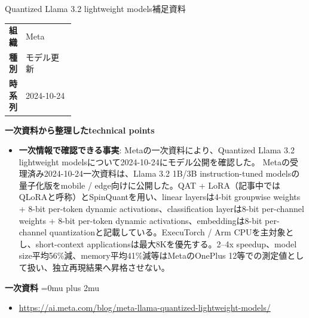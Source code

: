 \begin{technicalnote}{Quantized Llama 3.2 lightweight models}{補足資料}
\begingroup
\begin{tabularx}{\linewidth}{@{}>{\bfseries}p{0.22\linewidth}X@{}}
組織 & Meta \\
種別 & モデル更新 \\
時系列 & 2024-10-24 \\
\end{tabularx}
\smallskip
{\bfseries 一次資料から整理したtechnical points}
\begin{itemize}[leftmargin=1.5em,itemsep=0.35em]
\item \textbf{一次情報で確認できる事実}: Metaの一次資料により、Quantized Llama 3.2 lightweight modelsについて2024-10-24にモデル公開を確認した。 Metaの受理済み2024-10-24一次資料は、Llama 3.2 1B/3B instruction-tuned modelsの量子化版をmobile / edge向けに公開した。QAT + LoRA（記事中ではQLoRAと呼称）とSpinQuantを用い、linear layersは4-bit groupwise weights + 8-bit per-token dynamic activations、classification layerは8-bit per-channel weights + 8-bit per-token dynamic activations、embeddingは8-bit per-channel quantizationと記載している。ExecuTorch / Arm CPUを主対象とし、short-context applicationsは最大8Kを優先する。2–4x speedup、model size平均56\%減、memory平均41\%減等はMetaのOnePlus 12等での測定値として扱い、独立再現結果へ昇格させない。
\end{itemize}
\begin{minipage}{\linewidth}
\begin{samepage}
{\bfseries 一次資料}
\begingroup\sloppy
\Urlmuskip=0mu plus 2mu\relax
\begin{itemize}[leftmargin=1.5em,itemsep=0.25em]
\item {\scriptsize\url{https://ai.meta.com/blog/meta-llama-quantized-lightweight-models/}}
\end{itemize}
\endgroup
\end{samepage}
\end{minipage}
\endgroup
\end{technicalnote}
\medskip
